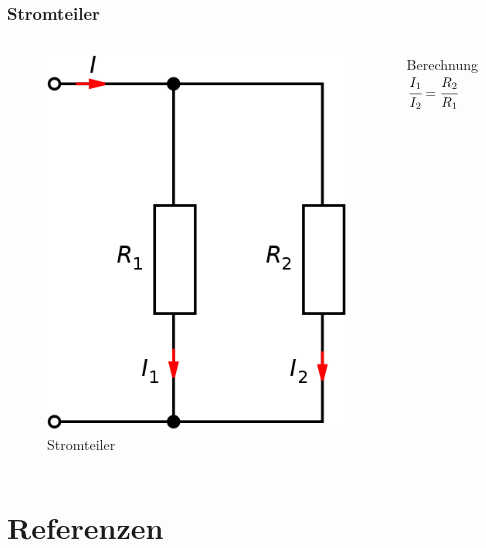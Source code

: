 \begin{frame}
	\frametitle{Stromteiler}
	\begin{columns}
		\begin{center}
			\begin{figure}
				\includegraphics[width=.6\textwidth,height=.75\textheight,keepaspectratio]{e04/Stromteiler.png}
				\caption{Stromteiler \cite{stromteiler}}
				\label{fig_stromteiler}
			\end{figure}
		\end{center}
		\begin{block}{Berechnung}
			$\cfrac{I_1}{I_2} = \cfrac{R_2}{R_1}$
		\end{block}
	\end{columns}
\end{frame}


\section*{Referenzen}

